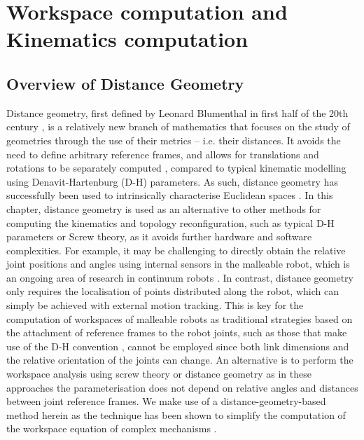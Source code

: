 \section{Workspace computation and Kinematics computation}

\subsection{Overview of Distance Geometry}\label{sec:mr_dist}
Distance geometry, first defined by Leonard Blumenthal in first half of the 20th century \cite{blumenthal1953theory}, is a relatively new branch of mathematics that focuses on the study of geometries through the use of their metrics -- i.e. their distances. It avoids the need to define arbitrary reference frames, and allows for translations and rotations to be separately computed \cite{rojas-thesis}, compared to typical kinematic modelling using Denavit-Hartenburg (D-H) parameters. As such, distance geometry has successfully been used to intrinsically characterise Euclidean spaces \cite{havel1991use}. In this chapter, distance geometry is used as an alternative to other methods for computing the kinematics and topology reconfiguration, such as typical D-H parameters or Screw theory, as it avoids further hardware and software complexities. For example, it may be challenging to directly obtain the relative joint positions and angles using internal sensors in the malleable robot, which is an ongoing area of research in continuum robots \cite{wang2017soft}. In contrast, distance geometry only requires the localisation of points distributed along the robot, which can simply be achieved with external motion tracking. This is key for the computation of workspaces of malleable robots as traditional strategies based on the attachment of reference frames to the robot joints, such as those that make use of the D-H convention \cite{kung2005development, li2011design}, cannot be employed since both link dimensions and the relative orientation of the joints can change. An alternative is to perform the workspace analysis using screw theory \cite{coppola20146, xie2015design} or distance geometry \cite{rojas-thesis} as in these approaches the parameterisation does not depend on relative angles and distances between joint reference frames. We make use of a distance-geometry-based method herein as the technique has been shown to simplify the computation of the workspace equation of complex mechanisms \cite{rojas2016coupler, rojas-peaucellier}.

